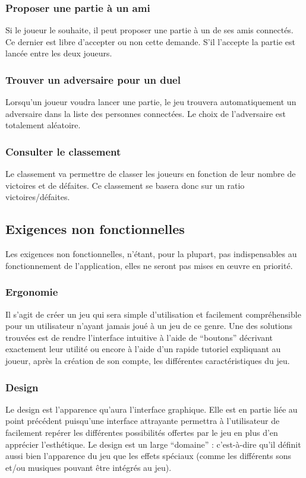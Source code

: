 \documentclass[11pt,a4paper]{article}
\begin{document}
\subsubsection*{Proposer une partie à un ami}

Si le joueur le souhaite, il peut proposer une partie à un de ses
amis connectés. Ce dernier est libre d'accepter ou non cette demande.
S'il l'accepte la partie est lancée entre les deux joueurs.


\subsubsection*{Trouver un adversaire pour un duel}

Lorsqu'un joueur voudra lancer une partie, le jeu trouvera
automatiquement un adversaire dans la liste des personnes
connectées. Le choix de l'adversaire est totalement aléatoire.


\subsubsection*{Consulter le classement}

Le classement va permettre de classer les joueurs en fonction de
leur nombre de victoires et de défaites. Ce classement se
basera donc sur un ratio victoires/défaites.


\subsection{Exigences non fonctionnelles}
\label{sec:exi-nonfonc}

Les exigences non fonctionnelles, n'étant, pour la plupart, pas indispensables au fonctionnement de l'application, elles ne seront pas mises en œuvre en priorité.


\subsubsection*{Ergonomie}
Il s'agit de créer un jeu qui sera simple d'utilisation et facilement compréhensible pour un utilisateur n'ayant jamais joué à un jeu de ce genre.
\medbreak
Une des solutions trouvées est de rendre l'interface intuitive à l'aide de ``boutons'' décrivant exactement leur utilité ou encore à l'aide d'un rapide tutoriel expliquant au joueur, après la création de son compte, les différentes caractéristiques du jeu.


\subsubsection*{Design}
Le design est l'apparence qu'aura l'interface graphique. Elle est en partie liée au point précédent puisqu'une interface attrayante permettra à l'utilisateur de facilement repérer les différentes possibilités offertes par le jeu en plus d'en apprécier l'esthétique.
\medbreak
Le design est un large ``domaine'' : c'est-à-dire qu'il définit aussi bien l'apparence du jeu  que les effets spéciaux (comme les différents sons et/ou musiques pouvant être intégrés au jeu).
\end{document}

